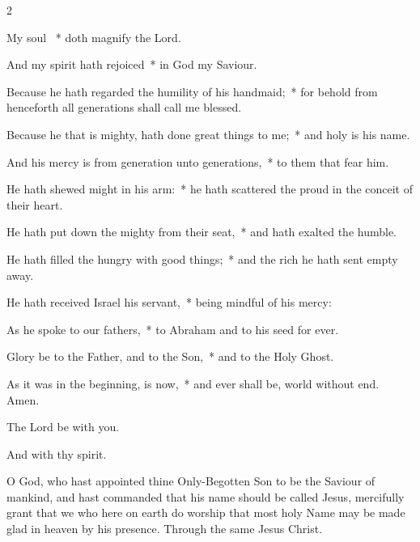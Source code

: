 \documentclass[12pt]{book}
\begin{document}
\begin{multicols}{2}
 \begin{enpars}
My soul \cc~* doth magnify the Lord.

And my spirit hath rejoiced~* in God my Saviour.

Because he hath regarded the humility of his handmaid;~* for behold from henceforth all generations shall call me blessed.

Because he that is mighty, hath done great things to me;~* and holy is his name.

And his mercy is from generation unto generations,~* to them that fear him.

He hath shewed might in his arm:~* he hath scattered the proud in the conceit of their heart.

He hath put down the mighty from their seat,~* and hath exalted the humble.

He hath filled the hungry with good things;~* and the rich he hath sent empty away.

He hath received Israel his servant,~* being mindful of his mercy:

As he spoke to our fathers,~* to Abraham and to his seed for ever.

Glory be to the Father, and to the Son,~* and to the Holy Ghost.

As it was in the beginning, is now,~* and ever shall be, world without end. Amen.
\end{enpars}
\end{multicols}

\collectlateng

{\noindent \vv The Lord be with you.

\noindent \rr  And with thy spirit.

\noindent O God, who hast appointed thine Only-Begotten Son to be the Saviour of mankind, and hast commanded that his name should be called Jesus, mercifully grant that we who here on earth do worship that most holy Name may be made glad in heaven by his presence.
Through the same Jesus Christ.}
\end{document}
